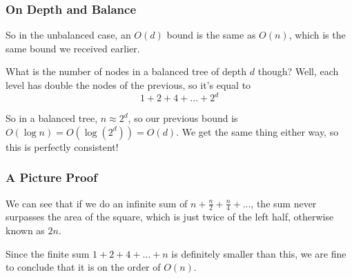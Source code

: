\documentclass[aspectratio=169, handout]{beamer}
\begin{document}
\begin{frame}[fragile]
  \frametitle{On Depth and Balance}

  \ptmt


  \pause
  \vspace{\fill}

  So in the unbalanced case, an $O(d)$ bound is the same as $O(n)$, which is the same
  bound we received earlier.

  \pause
  \vspace{\fill}

  What is the number of nodes in a balanced tree of depth $d$ though? Well, each level has
  double the nodes of the previous, so it's equal to
  $$1 + 2 + 4 + ... + 2^d$$

  \pause
  \vspace{\fill}


  \pause
  \vspace{\fill}

  So in a balanced tree, $n \approx 2^d$, so our previous bound is $O(\log n) = O(\log (2^d)) = O(d)$.
  We get the same thing either way, so this is perfectly consistent!
\end{frame}

\begin{frame}[fragile]
  \frametitle{A Picture Proof}

  \begin{center}
  \end{center}

  \pause
  \vspace{\fill}

  We can see that if we do an infinite sum of $n + \frac{n}{2} + \frac{n}{4} + ...$,
  the sum never surpasses the area of the square, which is just twice of the left half,
  otherwise known as $2n$.

  \pause
  \vspace{\fill}

  Since the finite sum $1 + 2 + 4 + ... + n$ is definitely smaller than this, we are
  fine to conclude that it is on the order of $O(n)$.
\end{frame}
\end{document}
